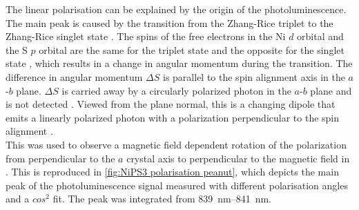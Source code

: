 \documentclass[
	twoside,
	parskip=half,
	a4paper,
]{scrbook}
\begin{document}
The linear polarisation can be explained by the origin of the photoluminescence.
The main peak is caused by the transition from the Zhang-Rice triplet to the Zhang-Rice singlet state \cite{NiPS3_coherent}.
The spins of the free electrons in the Ni $d$ orbital and the S $p$ orbital are the same for the triplet state and the opposite for the singlet state \cite{NiPS3_coherent}, which results in a change in angular momentum during the transition.
The difference in angular momentum $\Delta S$ is parallel to the spin alignment axis in the $a$-$b$ plane.
$\Delta S$ is carried away by a circularly polarized photon in the $a$-$b$ plane and is not detected \cite{NiPS3_linear}.
Viewed from the plane normal, this is a changing dipole that emits a linearly polarized photon with a polarization perpendicular to the spin alignment \cite{NiPS3_linear}.\\
This was used to observe a magnetic field dependent rotation of the polarization from perpendicular to the $a$ crystal axis to perpendicular to the magnetic field in \cite{NiPS3_linear}.
This is reproduced in \autoref{fig:NiPS3 polarisation peanut}, which depicts the main peak of the photoluminescence signal measured with different polarisation angles and a $cos^2$ fit. The peak was integrated from \SIrange{839}{841}{nm}.
\end{document}
